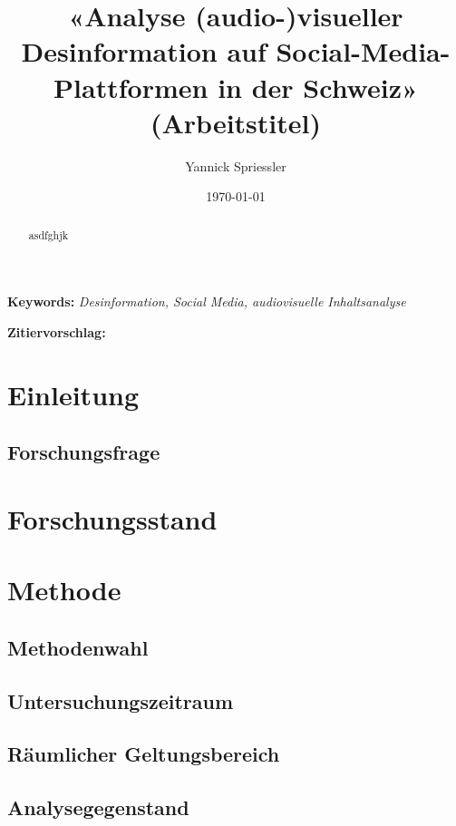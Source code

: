 \documentclass[12pt,a4paper]{article}        %
\title{«Analyse (audio-)visueller Desinformation auf Social-Media-Plattformen in der Schweiz» (Arbeitstitel)}        %
\author{Yannick Spriessler}     %
\date{\today}     %
\begin{document}
\begin{titlingpage} %

  
\end{titlingpage}
\pagebreak      %
\thispagestyle{empty}
\setcounter{page}{0}    %
\tableofcontents        %
\pagebreak
\renewcommand{\abstractname}{Abstract}
\begin{abstract}
  \setlength{\parindent}{0pt}  
    asdfghjk \\
\end{abstract}

\textbf{Keywords:} \textit{Desinformation, Social Media, audiovisuelle Inhaltsanalyse}


\textbf{Zitiervorschlag:}
\linebreak
\pagebreak
\section{Einleitung}

\subsection{Forschungsfrage}
\pagebreak
\section{Forschungsstand}
\pagebreak
\section{Methode}
\subsection{Methodenwahl}
\subsection{Untersuchungszeitraum}
\subsection{Räumlicher Geltungsbereich}
\subsection{Analysegegenstand}
\end{document}
